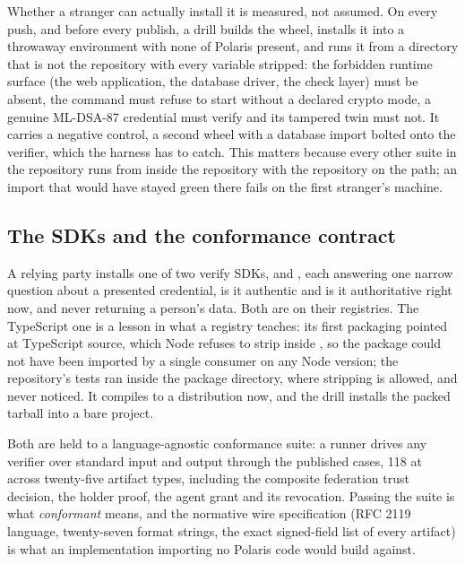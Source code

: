 Whether a stranger can actually install it is measured, not assumed. On every push, and before every
publish, a drill builds the wheel, installs it into a throwaway environment with none of Polaris
present, and runs it from a directory that is not the repository with every 
variable stripped: the forbidden runtime surface (the web application, the database driver, the
check layer) must be absent, the command must refuse to start without a declared crypto mode, a
genuine ML-DSA-87 credential must verify and its tampered twin must not. It carries a negative
control, a second wheel with a database import bolted onto the verifier, which the harness has to
catch. This matters because every other suite in the repository runs from inside the repository with
the repository on the path; an import that would have stayed green there fails on the first
stranger's machine. \sImpl

\subsection{The SDKs and the conformance contract}

A relying party installs one of two verify SDKs,  and ,
each answering one narrow question about a presented credential, is it authentic and is it
authoritative right now, and never returning a person's data. Both are on their registries. The
TypeScript one is a lesson in what a registry teaches: its first packaging pointed  at
TypeScript source, which Node refuses to strip inside , so the package could not
have been imported by a single consumer on any Node version; the repository's tests ran inside the
package directory, where stripping is allowed, and never noticed. It compiles to a distribution now,
and the drill installs the packed tarball into a bare project. \sImpl

Both are held to a language-agnostic conformance suite: a runner drives any verifier over standard
input and output through the published cases, 118 at  across twenty-five artifact
types, including the composite federation trust decision, the holder proof, the agent grant and its
revocation. Passing the suite is what \emph{conformant} means, and the normative wire specification
(RFC 2119 language, twenty-seven format strings, the exact signed-field list of every artifact) is
what an implementation importing no Polaris code would build against. \sImpl

